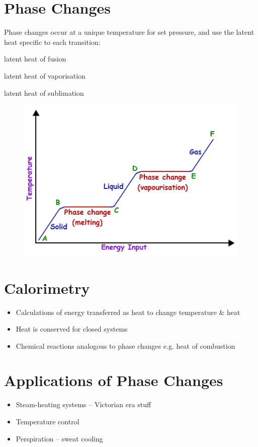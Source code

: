 \documentclass[a4paper, 11pt, normalem]{report}
\begin{document}
\section{Phase Changes}
Phase changes occur at a unique temperature for set pressure, and use the latent heat specific to each transition:
\begin{description}[align=right,labelwidth=5cm]
    \item[Between solid \& liquid:] latent heat of fusion
    \item[Between liquid \& gas:] latent heat of vaporisation
    \item[Between solid \& gas:] latent heat of sublimation
\end{description}
\begin{figure}[H]
    \centering
    \includegraphics[scale=0.65]{download.png}
\end{figure}

\section{Calorimetry}
\begin{itemize}
    \item Calculations of energy transferred as heat to change temperature \& heat
    \item Heat is conserved for closed systems
    \item Chemical reactions analogous to phase changes e.g. heat of combustion
\end{itemize}

\section{Applications of Phase Changes}
\begin{itemize}
    \item Steam-heating systems -- Victorian era stuff
    \item Temperature control
    \item Perspiration -- sweat cooling
\end{itemize}
\end{document}
